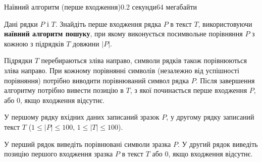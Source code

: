 \begin{problem}{Наївний алгоритм (перше входження)}{}{}{0.2 секунди}{64 мегабайти}

Дані рядки $P$ і $T$. Знайдіть перше входження рядка $P$ в текст $T$, використовуючи {\bf наївний алгоритм пошуку}, 
при якому виконується посимвольне порівняння $P$ з кожною з підрядків $T$ довжини $|P|$. 

Підрядки $T$ перебираються зліва направо, символи рядків також порівнюються зліва направо. 
При кожному порівнянні символів (незалежно від успішності порівняння) потрібно виводити порівнюваний символ рядка $P$. 
Після завершення алгоритму потрібно вивести позицію в $T$, з якої починається перше входження $P$, або $0$, якщо входження відсутнє. 

\InputFile
У першому рядку вхідних даних записаний зразок $P$, 
у другому рядку записаний текст $T$ ($1 \le |P| \le 100$, $1 \le |T| \le 100$).


\OutputFile
У перший рядок виведіть порівнювані символи зразка $P$.
У другий рядок виведіть позицію першого входження зразка $P$ в текст $T$ або $0$, якщо входження відсутнє.


\Examples

\begin{example}
%
\end{example}

\end{problem}


